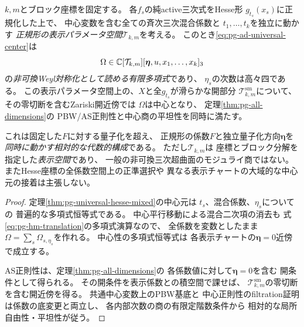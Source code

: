 \begin{proposition}[正規形の係数も動く相対普遍公式]
\label{prop:pg-ad-relative-chart}
$k,m$とブロック座標を固定する。
各$f_s$の純active三次式をHesse形
$g_{t_s}(x_s)$に正規化した上で、
中心変数を含む全ての斉次三次混合係数と
$t_1,\ldots,t_k$を独立に動かす
\emph{正規形の表示パラメータ空間}$\mathcal T_{k,m}$を考える。
このとき\eqref{eq:pg-ad-universal-center}は
\begin{equation}
 \Omega\in
 \mathbb C[\mathcal T_{k,m}][\boldsymbol\eta,u,x_1,\ldots,x_k]_3
\end{equation}
の\emph{非可換Weyl対称化として読める有限多項式}であり、
$\eta_s$の次数は高々四である。
この表示パラメータ空間上の、$X$と全$g_{t_s}$が滑らかな開部分
$\mathcal T_{k,m}^{\mathrm{sm}}$について、
その零切断を含むZariski開近傍では
$\Omega$は中心となり、
定理\ref{thm:pg-all-dimensions}の
PBW/AS正則性と中心商の平坦性を同時に満たす。

これは固定した$F$に対する量子化を超え、
正規形の係数$F$と独立量子化方向$\boldsymbol\eta$を
\emph{同時に動かす相対的な代数的構成}である。
ただし$\mathcal T_{k,m}$は
座標とブロック分解を指定した\emph{表示空間}であり、
一般の非可換三次超曲面のモジュライ商ではない。
またHesse座標の全係数空間上の正準選択や
異なる表示チャートの大域的な中心元の接着は主張しない。
\end{proposition}
\begin{proof}
定理\ref{thm:pg-universal-hesse-mixed}の中心元は
$t_s$、混合係数、$\eta_s$についての
普遍的な多項式恒等式である。
中心平行移動による混合二次項の消去も
式\eqref{eq:pg-hm-translation}の多項式演算なので、
全係数を変数としたまま
$\Omega=\sum_s\Omega_{s,\eta_s}$を作れる。
中心性の多項式恒等式は
各表示チャートの$\boldsymbol\eta=0$近傍で成立する。

AS正則性は、定理\ref{thm:pg-all-dimensions}の
各係数値に対して$\boldsymbol\eta=0$を含む
開条件として得られる。
その開条件を表示係数との積空間で課せば、
$\mathcal T_{k,m}^{\mathrm{sm}}$の零切断を含む開近傍を得る。
共通中心変数上のPBW基底と
中心正則性のfiltration証明は係数の底変更と両立し、
各内部次数の商の有限定階数条件から
相対的な局所自由性・平坦性が従う。
\end{proof}

